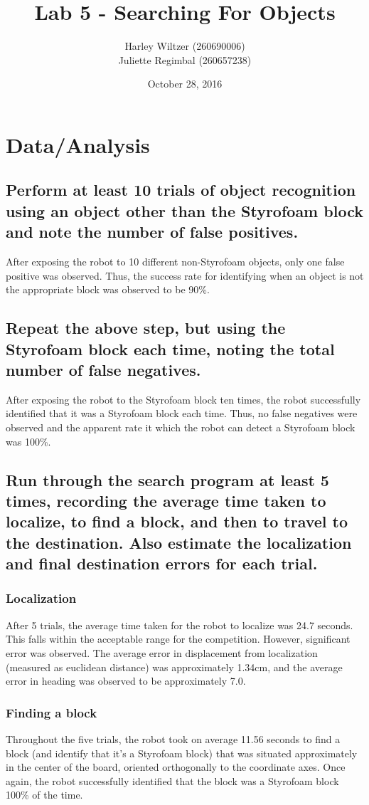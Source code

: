 \documentclass[10pt]{article}
\title{Lab 5 - Searching For Objects}
\author{Harley Wiltzer (260690006)\\Juliette Regimbal (260657238)}
\date{October 28, 2016}
\begin{document}
\maketitle
\section{Data/Analysis}
\subsection{Perform at least 10 trials of object recognition using an object other than the
Styrofoam block and note the number of false positives.}
After exposing the robot to 10 different non-Styrofoam objects, only one false positive was
observed. Thus, the success rate for identifying when an object is not the appropriate block was
observed to be 90\%.
\subsection{Repeat the above step, but using the Styrofoam block each time, noting the total number
of false negatives.}
After exposing the robot to the Styrofoam block ten times, the robot successfully identified that it
was a Styrofoam block each time. Thus, no false negatives were observed and the apparent rate it
which the robot can detect a Styrofoam block was 100\%.
\subsection{Run through the search program at least 5 times, recording the average time taken to
	localize, to find a block, and then to travel to the destination. Also estimate the localization
and final destination errors for each trial.}
\subsubsection{Localization}
After 5 trials, the average time taken for the robot to localize was 24.7 seconds. This falls within
the acceptable range for the competition. However, significant error was observed. The average error
in displacement from localization (measured as euclidean distance) was approximately 1.34cm, and the
average error in heading was observed to be approximately 7.0\degree.
\subsubsection{Finding a block}
Throughout the five trials, the robot took on average 11.56 seconds to find a block (and identify
that it's a Styrofoam block) that was situated approximately in the center of the board, oriented
orthogonally to the coordinate axes. Once again, the robot successfully identified that the block
was a Styrofoam block 100\% of the time.
\end{document}
